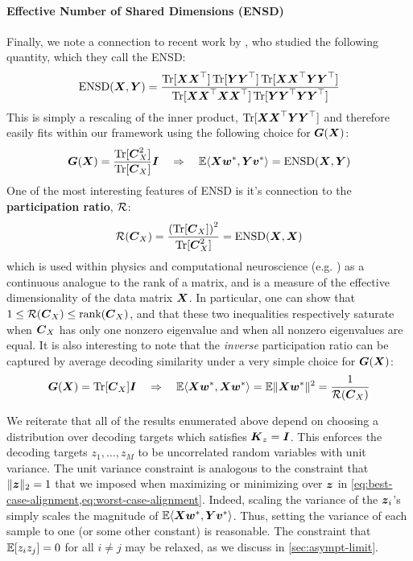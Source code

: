 \paragraph{Effective Number of Shared Dimensions (ENSD)}
Finally, we note a connection to recent work by \textcite{Giaffar2024}, who studied the following quantity, which they call the ENSD:
\begin{equation}
\textrm{ENSD}(\boldsymbol{X} , \boldsymbol{Y}) = \frac{\operatorname*{Tr}[\boldsymbol{X} \boldsymbol{X}^\top] \operatorname*{Tr}[\boldsymbol{Y} \boldsymbol{Y}^\top] \operatorname*{Tr}[\boldsymbol{X} \boldsymbol{X}^\top \boldsymbol{Y} \boldsymbol{Y}^\top]}{\operatorname*{Tr}[\boldsymbol{X} \boldsymbol{X}^\top \boldsymbol{X} \boldsymbol{X}^\top] \operatorname*{Tr}[\boldsymbol{Y} \boldsymbol{Y}^\top \boldsymbol{Y} \boldsymbol{Y}^\top]} 
\end{equation}
This is simply a rescaling of the inner product, $\operatorname*{Tr}[\boldsymbol{X} \boldsymbol{X}^\top \boldsymbol{Y} \boldsymbol{Y}^\top]$ and therefore easily fits within our framework using the following choice for $\boldsymbol{G}(\boldsymbol{X})$:
\begin{equation}
\boldsymbol{G}(\boldsymbol{X}) = \frac{\operatorname*{Tr}[\boldsymbol{C}_X^2]}{\operatorname*{Tr}[\boldsymbol{C}_X]} \boldsymbol{I} \quad \Rightarrow \quad 
\mathbb{E} \langle \boldsymbol{X} \boldsymbol{w}^*, \boldsymbol{Y} \boldsymbol{v}^* \rangle = \textrm{ENSD}(\boldsymbol{X}, \boldsymbol{Y} )
\end{equation}
One of the most interesting features of ENSD is it's connection to the \textbf{participation ratio}, $\mathcal{R}$:
\begin{equation}
\mathcal{R}(\boldsymbol{C}_X) = \frac{\left (\operatorname*{Tr}[\boldsymbol{C}_X] \right )^2}{\operatorname*{Tr}[\boldsymbol{C}_X^2]} = \textrm{ENSD}(\boldsymbol{X}, \boldsymbol{X})
\end{equation}
which is used within physics and computational neuroscience (e.g. \cite{Gao2015, Dabrowska2021, Recanatesi2022}) as a continuous analogue to the rank of a matrix, and is a measure of the effective dimensionality of the data matrix $\boldsymbol{X}$.
In particular, one can show that $1 \leq \mathcal{R}(\boldsymbol{C}_X) \leq \text{rank}(\boldsymbol{C}_X)$, and that these two inequalities respectively saturate when $\boldsymbol{C}_X$ has only one nonzero eigenvalue and when all nonzero eigenvalues are equal.
It is also interesting to note that the \textit{inverse} participation ratio can be captured by average decoding similarity under a very simple choice for $\boldsymbol{G}(\boldsymbol{X})$:
\begin{equation}
\boldsymbol{G}(\boldsymbol{X}) = \operatorname*{Tr}[\boldsymbol{C}_X] \boldsymbol{I} \quad \Rightarrow \quad \mathbb{E} \langle \boldsymbol{X} \boldsymbol{w}^*, \boldsymbol{X} \boldsymbol{w}^* \rangle = \mathbb{E} \Vert \boldsymbol{X} \boldsymbol{w}^* \Vert^2 =  \frac{1}{\mathcal{R}(\boldsymbol{C}_X)}
\end{equation}

We reiterate that all of the results enumerated above depend on choosing a distribution over decoding targets which satisfies $\boldsymbol{K}_z = \boldsymbol{I}$.
This enforces the decoding targets $z_1, \dots, z_M$ to be uncorrelated random variables with unit variance.
The unit variance constraint is analogous to the constraint that $\Vert \boldsymbol{z} \Vert_2 = 1$ that we imposed when maximizing or minimizing over $\boldsymbol{z}$ in \cref{eq:best-case-alignment,eq:worst-case-alignment}.
Indeed, scaling the variance of the $\boldsymbol{z}_i$'s simply scales the magnitude of $\mathbb{E} \langle \boldsymbol{X} \boldsymbol{w}^*, \boldsymbol{Y} \boldsymbol{v}^* \rangle$. Thus, setting the variance of each sample to one (or some other constant) is reasonable.
The constraint that $\mathbb{E}[z_i z_j] = 0$ for all $i \neq j$ may be relaxed, as we discuss in \cref{sec:asympt-limit}.





